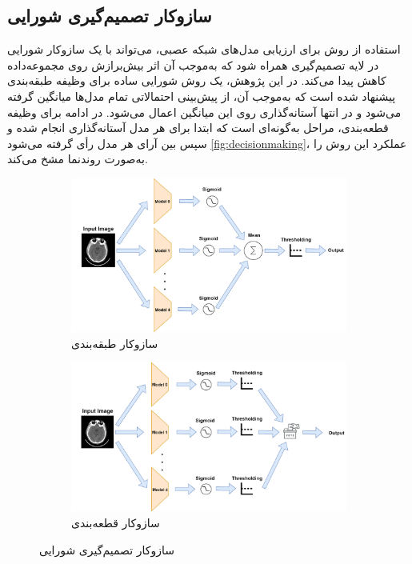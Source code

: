 \subsection{سازوکار تصمیم‌گیری شورایی}
\label{ch2-decision-policy}
استفاده از روش
برای ارزیابی مدل‌های شبکه‌ عصبی،‌ می‌تواند با یک سازوکار شورایی در لایه تصمیم‌گیری همراه شود که به‌موجب آن اثر بیش‌برازش روی مجموعه‌داده کاهش پیدا می‌کند. در این پژوهش،‌ یک روش شورایی ساده برای وظیفه طبقه‌بندی پیشنهاد شده است که به‌موجب آن، از پیش‌بینی احتمالاتی تمام مدل‌ها میانگین گرفته می‌شود و در انتها آستانه‌گذاری روی این میانگین اعمال می‌شود. در ادامه برای وظیفه قطعه‌بندی،‌ مراحل به‌گونه‌ای است که ابتدا برای هر مدل آستانه‌گذاری انجام شده و سپس بین آرای هر مدل رأی گرفته می‌شود 
\autoref{fig:decisionmaking}،
عملکرد این روش را به‌صورت روند‌نما مشخ می‌کند.


\begin{figure}[h!]
		\centering %
		\begin{subfigure}{0.49\textwidth}
			\includegraphics[width=\linewidth]{Images/Chapter2/decision_making.drawio}
			\caption{سازوکار طبقه‌بندی}
			\label{f61}
		\end{subfigure}\hfil %
		\begin{subfigure}{0.49\textwidth}
			\includegraphics[width=\linewidth]{Images/Chapter2/decision_making_seg.drawio}
			\caption{سازوکار قطعه‌بندی}
			\label{f62}
		\end{subfigure}\hfil %

		\caption{سازوکار تصمیم‌گیری شورایی}
		\label{fig:decisionmaking}
\end{figure}

